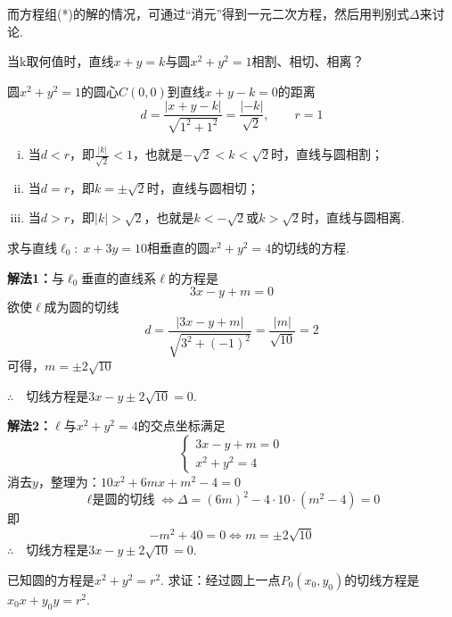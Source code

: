 而方程组(*)的解的情况，可通过“消元”得到一元二次方程，然后用判别式$\Delta$来讨论.











\begin{example}
    当k取何值时，直线$x+y=k$与圆$x^2+y^2=1$相割、相切、相离？
\end{example}

\begin{solution}
圆$x^2+y^2=1$的圆心$C(0,0)$到直线$x+y-k=0$的距离
\[d=\frac{|x+y-k|}{\sqrt{1^2+1^2}}=\frac{|-k|}{\sqrt{2}},\qquad r=1\]
\begin{enumerate}[(i)]
\item 当$d<r$，即$\frac{|k|}{\sqrt{2}}<1$，也就是$-\sqrt{2}<k<\sqrt{2}$时，直线与圆相割；
\item 当$d=r$，即$k=\pm \sqrt{2}$时，直线与圆相切；
\item 当$d>r$，即$|k|>\sqrt{2}$，也就是$k<-\sqrt{2}$或$k>\sqrt{2}$时，直线与圆相离.
\end{enumerate}
\end{solution}


\begin{example}
    求与直线$\ell_0:\; x+3y=10$相垂直的圆$x^2+y^2=4$的切线的方程.
\end{example}

\begin{solution}
\textbf{解法1：}与$\ell_0$垂直的直线系$\ell$的方程是
\[3x-y+m=0\]
欲使$\ell$成为圆的切线
\[d=\frac{|3x-y+m|}{\sqrt{3^2+(-1)^2}}=\frac{|m|}{\sqrt{10}}=2\]
可得，$m=\pm 2\sqrt{10}$

$\therefore\quad $切线方程是$3x-y\pm 2\sqrt{10}=0$.

\textbf{解法2：}$\ell$与$x^2+y^2=4$的交点坐标满足
\[\begin{cases}
    3x-y+m=0\\ x^2+y^2=4
\end{cases}\]
消去$y$，整理为：$10x^2+6mx+m^2-4=0$
\[\text{$\ell$是圆的切线}\Longleftrightarrow \Delta =(6m)^2-4\cdot 10\cdot (m^2-4)=0\]
即
\[-m^2+40=0\Longleftrightarrow m=\pm2\sqrt{10}\]
$\therefore\quad $切线方程是$3x-y\pm 2\sqrt{10}=0$.
\end{solution}



\begin{example}
已知圆的方程是$x^2+y^2=r^2$. 求证：经过圆上一点$P_0(x_0,y_0)$的切线方程是$x_0x+y_0y=r^2$.
\end{example}

